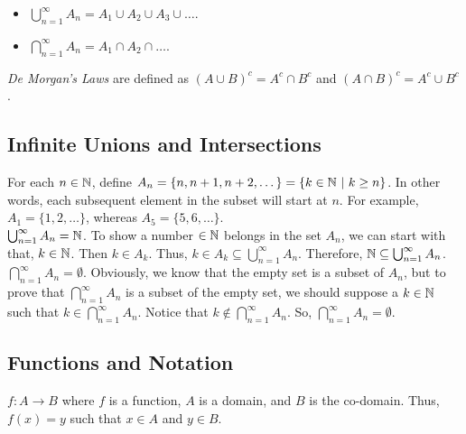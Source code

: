 \begin{itemize}
    \item \(\displaystyle \bigcup^\infty_{n=1} A_n = A_1 \cup A_2 \cup A_3 \cup \dots\). \\

    \item \(\displaystyle \bigcap^\infty_{n=1} A_n = A_1 \cap A_2 \cap \dots\). \\
\end{itemize}

\begin{definition}
    \textit{De Morgan's Laws} are defined as \((A \cup B)^c = A^c \cap B^c\) and \((A \cap B)^c = A^c \cup B^c\). 
\end{definition}


\subsection{Infinite Unions and Intersections} \hfill

For each \(n \in \mathbb{N}\), define \(A_n = \{n, n+1, n+2,\dots\} = \{k \in \mathbb{N} \ | \ k \geq n\}\). In other words, each subsequent element in the subset will start at \(n\). For example, \(A_1 = \{1,2,\dots\}\), whereas \(A_5 = \{5,6,\dots\}.\)   \\

\(\bigcup^\infty_{n=1} A_n = \mathbb{N}\). To show a number \(\in \mathbb{N}\) belongs in the set \(A_n\), we can start with that, \(k \in \mathbb{N}\). Then \(k \in A_k\). Thus, \(k \in A_k \subseteq \bigcup^\infty_{n=1}A_n\). Therefore, \(\mathbb{N} \subseteq \bigcup^\infty_{n=1}A_n\). \\

\(\bigcap^\infty_{n=1}A_n = \emptyset\). Obviously, we know that the empty set is a subset of \(A_n\), but to prove that \(\bigcap^\infty_{n=1}A_n\) is a subset of the empty set, we should suppose a \(k \in \mathbb{N}\) such that \(k \in \bigcap^\infty_{n=1}A_n\). Notice that \(k \notin \bigcap^\infty_{n=1}A_n\). So, \(\bigcap^\infty_{n=1}A_n = \emptyset\).

\subsection{Functions and Notation} \hfill

\(f \colon A \rightarrow B\) where \(f\) is a function, \(A\) is a domain, and \(B\) is the co-domain. Thus, \(f(x) = y\) such that \(x \in A\) and \(y \in B\). \\

